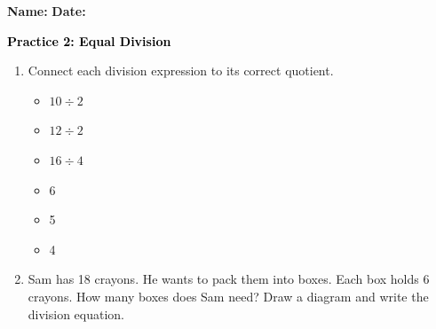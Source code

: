 \documentclass[12pt, letterpaper, fleqn]{article}
\begin{document}
\textbf{Name:} \underline{\hspace{5cm}}
\hfill
\textbf{Date:} \underline{\hspace{3cm}}\\

\begin{tcolorbox}[colback=customteal!20]
    \large\textcolor{black}{\textbf{Practice 2: Equal Division}}
\end{tcolorbox}

\vspace{5mm}
\begin{enumerate}[itemsep=2.5cm, leftmargin=0.6cm]
\item Connect each division expression to its correct quotient.
\\
\begin{minipage}{0.4\textwidth}
\begin{itemize}[itemsep=1cm]
  \item $10 \div 2$
  \item $12 \div 2$
  \item $16 \div 4$
\end{itemize}
\end{minipage}
\begin{minipage}{0.4\textwidth}
\begin{itemize}[itemsep=1cm]
  \item 6
  \item 5
  \item 4
\end{itemize}
\end{minipage}

\item Sam has 18 crayons. He wants to pack them into boxes. Each box holds 6 crayons. How many boxes does Sam need? Draw a diagram and write the division equation.
\end{enumerate}
\end{document}

